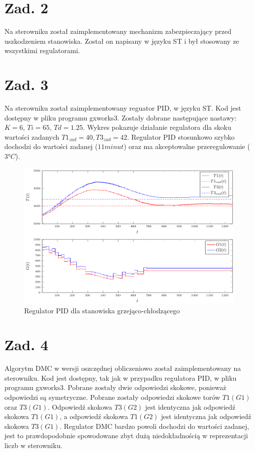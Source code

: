\documentclass[a4paper,titlepage,11pt,twosides,floatssmall]{mwrep}
\begin{document}
\chapter{Zad. 2}
Na sterowniku został zaimplementowany mechanizm zabezpieczający przed uszkodzeniem stanowiska. Został on napisany w języku ST i był stosowany ze wszystkimi regulatorami.


\endgroup

\chapter{Zad. 3}

Na sterowniku został zaimplementowany reguator PID, w języku ST. Kod jest dostępny w pliku programu gxworks3. Zostały dobrane następujące nastawy: $K = 6$, $Ti = 65$, $Td = 1.25$. Wykres pokazuje działanie regulatora dla skoku wartości zadanych $T1_{zad} = 40, T3_{zad} = 42$. Regulator PID stosunkowo szybko dochodzi do wartości zadanej ($11 minut$) oraz ma akceptowalne przeregulowanie ($3°C$).

\begin{figure}[]
	\centering
	\includegraphics[scale=1]{../wykresy/zad3_pid.pdf}
	\caption{Regulator PID dla stanowiska grzejąco-chłodzącego}
	\label{zad3_pid}
\end{figure}

\chapter{Zad. 4}

Algorytm DMC w wersji oszczędnej obliczeniowo został zaimplementowany na sterowniku. Kod jest dostępny, tak jak w przypadku regulatora PID, w pliku programu gxworks3. Pobrane zostały dwie odpowiedzi skokowe, ponieważ odpowiedzi są symetryczne. Pobrane zostały odpowiedzi skokowe torów $T1(G1)$ oraz $T3(G1)$. Odpowiedź skokowa $T3(G2)$ jest identyczna jak odpowiedź skokowa $T1(G1)$, a odpowiedź skokowa $T1(G2)$ jest identyczna jak odpowiedź skokowa $T3(G1)$. Regulator DMC bardzo powoli dochodzi do wartości zadanej, jest to prawdopodobnie spowodowane zbyt dużą niedokładnością w reprezentacji liczb w sterowniku.
\end{document}
